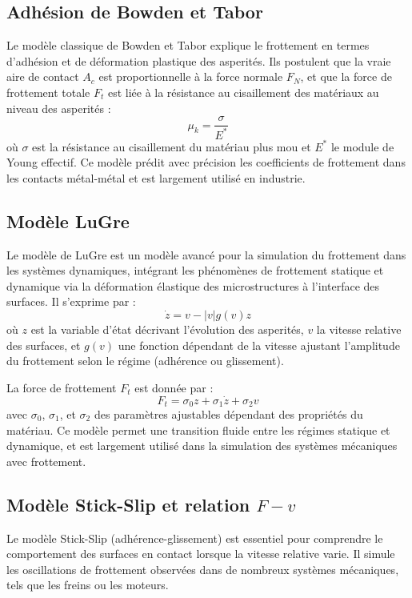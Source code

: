 \subsection{Adhésion de Bowden et Tabor}
Le modèle classique de Bowden et Tabor explique le frottement en termes d’adhésion et de déformation plastique des asperités. Ils postulent que la vraie aire de contact \(A_c\) est proportionnelle à la force normale \(F_N\), et que la force de frottement totale \(F_t\) est liée à la résistance au cisaillement des matériaux au niveau des asperités :
\begin{equation}
\mu_k = \frac{\sigma}{E^*} \label{eq:bowden_tabor}
\end{equation}
où \(\sigma\) est la résistance au cisaillement du matériau plus mou et \(E^*\) le module de Young effectif. Ce modèle prédit avec précision les coefficients de frottement dans les contacts métal-métal et est largement utilisé en industrie.

\subsection{Modèle LuGre}
Le modèle de LuGre est un modèle avancé pour la simulation du frottement dans les systèmes dynamiques, intégrant les phénomènes de frottement statique et dynamique via la déformation élastique des microstructures à l’interface des surfaces. Il s’exprime par :
\begin{equation}
\dot{z} = v - |v| g(v) z \label{eq:luGre_z}
\end{equation}
où \(z\) est la variable d’état décrivant l’évolution des asperités, \(v\) la vitesse relative des surfaces, et \(g(v)\) une fonction dépendant de la vitesse ajustant l’amplitude du frottement selon le régime (adhérence ou glissement).

La force de frottement \(F_t\) est donnée par :
\begin{equation}
F_t = \sigma_0 z + \sigma_1 \dot{z} + \sigma_2 v \label{eq:luGre_Ft}
\end{equation}
avec \(\sigma_0\), \(\sigma_1\), et \(\sigma_2\) des paramètres ajustables dépendant des propriétés du matériau. Ce modèle permet une transition fluide entre les régimes statique et dynamique, et est largement utilisé dans la simulation des systèmes mécaniques avec frottement.

\subsection{Modèle Stick-Slip et relation \(F - v\)}
Le modèle Stick-Slip (adhérence-glissement) est essentiel pour comprendre le comportement des surfaces en contact lorsque la vitesse relative varie. Il simule les oscillations de frottement observées dans de nombreux systèmes mécaniques, tels que les freins ou les moteurs.

